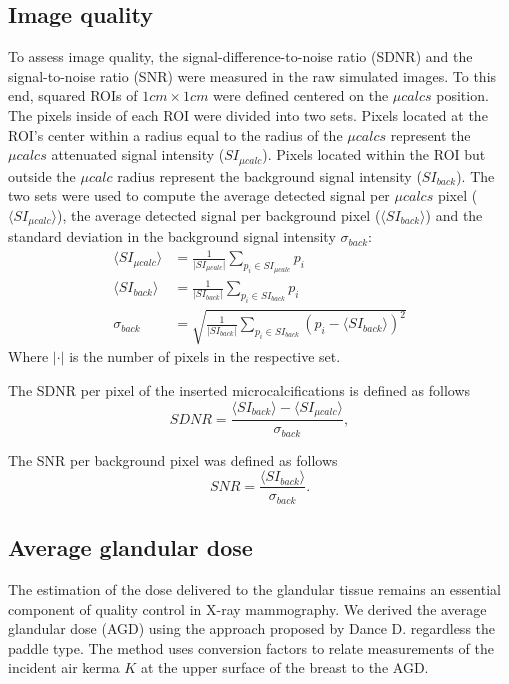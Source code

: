 \subsection{Image quality }\label{section:averagegalndulardose}
 To assess image quality, the signal-difference-to-noise ratio (SDNR)  and the signal-to-noise ratio (SNR)  were measured in the raw simulated images. To this end, squared ROIs of  $1cm \times 1cm$ were defined centered on the $\mu calcs$ position. The pixels inside of each ROI were divided into two sets. Pixels located  at the ROI's center within a radius equal to the radius of the $\mu calcs$  represent the $\mu calcs$ attenuated signal intensity ($SI_{\mu calc}$). Pixels located within the ROI but outside the $\mu calc$ radius represent the background signal intensity ($SI_{back}$). The two sets were used to compute the average detected signal per $\mu calcs$ pixel ($\langle SI_{\mu calc}\rangle$), the average detected signal per background pixel  ($\langle SI_{back}\rangle$) and the standard deviation in the background signal intensity $\sigma_{back}$:
 \begin{align}
 \langle SI_{\mu calc}\rangle& = \frac{1}{\vert SI_{\mu calc}\vert} \sum_{p_i \in SI_{\mu calc}}p_i \\
  \langle SI_{back}\rangle &= \frac{1}{\vert SI_{back}\vert} \sum_{p_i \in SI_{back}}p_i\\
  \sigma_{back} &= \sqrt{\frac{1}{\vert SI_{back}\vert} \sum_{p_i \in SI_{back}} (p_i- \langle SI_{back}\rangle)^2}
  \end{align}
Where $\vert\cdot\vert$  is the number of pixels in the respective set.

  The SDNR per pixel of the inserted microcalcifications is defined as follows
 \begin{equation}
 SDNR = \frac{\langle SI_{back}\rangle - \langle SI_{\mu calc}\rangle}{\sigma_{back}},
\end{equation}

 
The SNR per background pixel was defined as follows  
 \begin{equation}
 SNR = \frac{\langle SI_{back}\rangle}{\sigma_{back}}.
\end{equation}



\subsection{Average glandular dose}
The estimation of the dose delivered to the glandular tissue remains an essential component of quality control in X-ray mammography. We derived the average glandular dose (AGD) using the approach proposed by Dance D. \citep{dance_additional_2000} regardless the paddle type. The method uses conversion factors to relate measurements of the incident air kerma $K$ at the upper surface of the breast to the AGD. 

